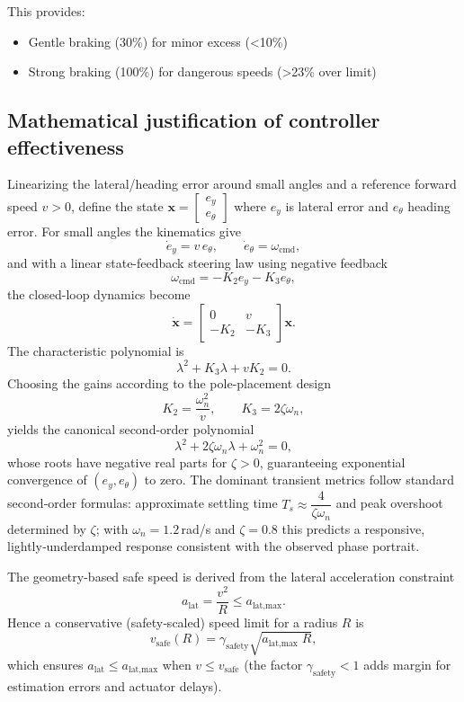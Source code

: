 \documentclass[12pt]{article}
\begin{document}
This provides:
\begin{itemize}
    \item Gentle braking (30\%) for minor excess (<10\%)
    \item Strong braking (100\%) for dangerous speeds (>23\% over limit)
\end{itemize}

\subsection*{Mathematical justification of controller effectiveness}

Linearizing the lateral/heading error around small angles and a reference forward speed $v>0$, define the state
$\mathbf{x} = \begin{bmatrix} e_y \\ e_\theta \end{bmatrix}$ where $e_y$ is lateral error and $e_\theta$ heading error.
For small angles the kinematics give
\[
\dot e_y = v\, e_\theta,\qquad
\dot e_\theta = \omega_{\text{cmd}},
\]
and with a linear state-feedback steering law using negative feedback
\[
\omega_{\text{cmd}} = -K_2 e_y - K_3 e_\theta,
\]
the closed-loop dynamics become
\[
\dot{\mathbf{x}} = 
\begin{bmatrix}
0 & v\\[4pt]
- K_2 & -K_3
\end{bmatrix}\mathbf{x}.
\]
The characteristic polynomial is
\[
\lambda^2 + K_3 \lambda + v K_2 = 0.
\]
Choosing the gains according to the pole-placement design
\[
K_2 = \frac{\omega_n^2}{v},\qquad K_3 = 2\zeta\omega_n,
\]
yields the canonical second-order polynomial
\[
\lambda^2 + 2\zeta\omega_n \lambda + \omega_n^2 = 0,
\]
whose roots have negative real parts for $\zeta>0$, guaranteeing exponential convergence of $(e_y,e_\theta)$ to zero. The dominant transient metrics follow standard second‑order formulas: approximate settling time $T_s \approx \dfrac{4}{\zeta\omega_n}$ and peak overshoot determined by $\zeta$; with $\omega_n=1.2\,$rad/s and $\zeta=0.8$ this predicts a responsive, lightly‑underdamped response consistent with the observed phase portrait.

The geometry-based safe speed is derived from the lateral acceleration constraint
\[
a_{\text{lat}} = \frac{v^2}{R} \le a_{\text{lat,max}}.
\]
Hence a conservative (safety‑scaled) speed limit for a radius $R$ is
\[
v_{\text{safe}}(R) = \gamma_{\text{safety}}\sqrt{a_{\text{lat,max}}\; R},
\]
which ensures $a_{\text{lat}}\le a_{\text{lat,max}}$ when $v\le v_{\text{safe}}$ (the factor $\gamma_{\text{safety}}<1$ adds margin for estimation errors and actuator delays).
\end{document}
